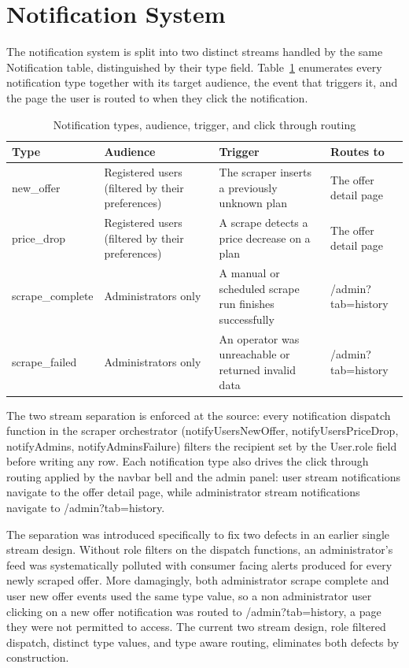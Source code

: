 \section{Notification System}

The notification system is split into two distinct streams handled by the same Notification table, distinguished by their type field. Table~\ref{tab:notif-types} enumerates every notification type together with its target audience, the event that triggers it, and the page the user is routed to when they click the notification.

\begin{table}[H]
  \caption{Notification types, audience, trigger, and click through routing}
  \label{tab:notif-types}
  \centering\small
  \begin{tabular}{|p{2.7cm}|p{2.4cm}|p{4.5cm}|p{3.6cm}|}
    \hline
    \textbf{Type} & \textbf{Audience} & \textbf{Trigger} & \textbf{Routes to} \\
    \hline
    new\_offer        & Registered users (filtered by their preferences) & The scraper inserts a previously unknown plan & The offer detail page \\
    \hline
    price\_drop       & Registered users (filtered by their preferences) & A scrape detects a price decrease on a plan & The offer detail page \\
    \hline
    scrape\_complete  & Administrators only & A manual or scheduled scrape run finishes successfully & /admin?tab=history \\
    \hline
    scrape\_failed    & Administrators only & An operator was unreachable or returned invalid data & /admin?tab=history \\
    \hline
  \end{tabular}
\end{table}

The two stream separation is enforced at the source: every notification dispatch function in the scraper orchestrator (notifyUsersNewOffer, notifyUsersPriceDrop, notifyAdmins, notifyAdminsFailure) filters the recipient set by the User.role field before writing any row. Each notification type also drives the click through routing applied by the navbar bell and the admin panel: user stream notifications navigate to the offer detail page, while administrator stream notifications navigate to /admin?tab=history.

The separation was introduced specifically to fix two defects in an earlier single stream design. Without role filters on the dispatch functions, an administrator's feed was systematically polluted with consumer facing alerts produced for every newly scraped offer. More damagingly, both administrator \guillemotleft{}scrape complete\guillemotright{} and user \guillemotleft{}new offer\guillemotright{} events used the same type value, so a non administrator user clicking on a \guillemotleft{}new offer\guillemotright{} notification was routed to /admin?tab=history, a page they were not permitted to access. The current two stream design, role filtered dispatch, distinct type values, and type aware routing, eliminates both defects by construction.

